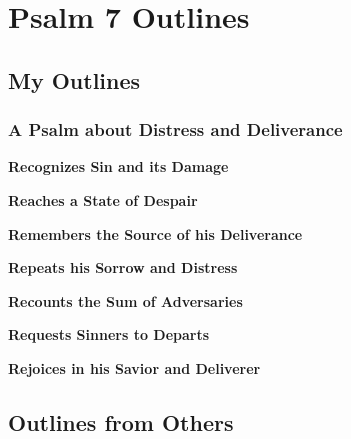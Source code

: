 \section{Psalm 7 Outlines}

\subsection{My Outlines}

\subsubsection{A Psalm about Distress and Deliverance}

\begin{compactenum}[I.]
    \item \textbf{Recognizes Sin and its Damage}
    \item \textbf{Reaches a State of Despair}
    \item \textbf{Remembers the Source of his Deliverance}
    \item \textbf{Repeats his Sorrow and Distress}
    \item \textbf{Recounts the Sum of Adversaries}
    \item \textbf{Requests Sinners to Departs}
    \item \textbf{Rejoices in his Savior and Deliverer}
\end{compactenum}

\subsection{Outlines from Others}

